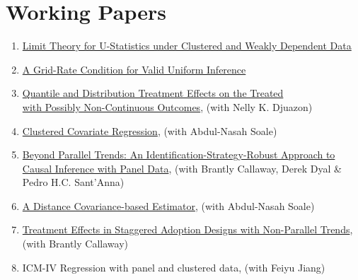 \documentclass[12pt,letterpaper]{article}
\begin{document}
\section*{Working Papers}
\begin{enumerate}
    \item \href{https://arxiv.org/pdf/2608.18443}{Limit Theory for U-Statistics under Clustered and Weakly Dependent Data}

    \item \href{https://arxiv.org/pdf/2605.12284}{A Grid-Rate Condition for Valid Uniform Inference}

    \item \href{https://arxiv.org/pdf/2408.07842}{Quantile and Distribution Treatment Effects on the Treated\\ with Possibly Non-Continuous Outcomes}, (with Nelly K. Djuazon)
    
    \item \href{https://arxiv.org/pdf/2302.09255.pdf}{Clustered Covariate Regression}, (with Abdul-Nasah Soale)
  
    \item \href{https://arxiv.org/pdf/2511.21977}{Beyond Parallel Trends: An Identification-Strategy-Robust
Approach to Causal Inference with Panel Data}, (with Brantly Callaway, Derek Dyal \& Pedro H.C. Sant’Anna)
    
    \item \href{https://arxiv.org/pdf/2102.07008.pdf}{A Distance Covariance-based Estimator}, (with Abdul-Nasah Soale)
    
    \item \href{https://arxiv.org/pdf/2308.02899.pdf}{Treatment Effects in Staggered Adoption Designs with Non-Parallel Trends}, (with Brantly Callaway)
	
	  \item ICM-IV Regression with panel and clustered data, (with Feiyu Jiang) %

	
	
\end{enumerate}
\end{document}
